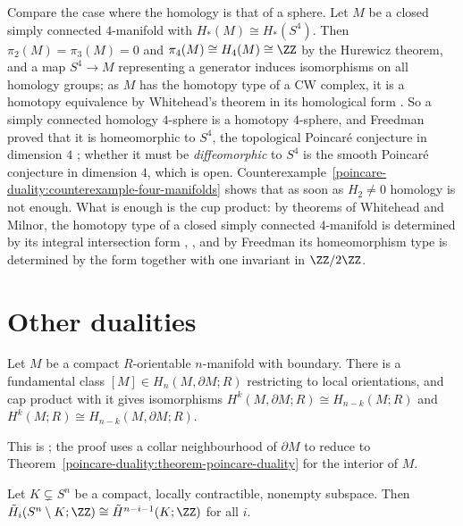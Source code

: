 \begin{remark}\label{poincare-duality:remark-poincare-conjecture}
Compare the case where the homology is that of a sphere. Let $M$ be a closed simply connected $4$-manifold with $H_*(M) \cong H_*(S^4)$. Then $\pi_2(M) = \pi_3(M) = 0$
and $\pi_4(M) \cong H_4(M) \cong \ZZ$ by the Hurewicz theorem, and a map $S^4 \to M$ representing a generator induces isomorphisms on all homology groups; as $M$ has the
homotopy type of a CW complex, it is a homotopy equivalence by Whitehead's theorem in its homological form \cite[Section 4.2 and Appendix]{hatcher-at}. So a
simply connected homology $4$-sphere is a homotopy $4$-sphere, and Freedman proved that it is homeomorphic to $S^4$, the topological Poincar\'e conjecture in
dimension $4$ \cite{freedman-1982}; whether it must be \emph{diffeomorphic} to $S^4$ is the smooth Poincar\'e conjecture in dimension $4$, which is open.
Counterexample~\ref{poincare-duality:counterexample-four-manifolds} shows that as soon as $H_2 \neq 0$ homology is not enough. What is enough is the cup product:
by theorems of Whitehead and Milnor, the homotopy type of a closed simply connected $4$-manifold is determined by its integral intersection form
\cite{whitehead-1949}, \cite{milnor-1958}, and by Freedman its homeomorphism type is determined by the form together with one invariant in $\ZZ/2\ZZ$.
\end{remark}

\section{Other dualities}\label{poincare-duality:section-other-dualities}

\begin{theorem}\label{poincare-duality:theorem-lefschetz-duality}
Let $M$ be a compact $R$-orientable $n$-manifold with boundary. There is a fundamental class $[M] \in H_n(M, \partial M; R)$ restricting to local orientations, and cap product with it
gives isomorphisms $H^k(M, \partial M; R) \cong H_{n-k}(M; R)$ and $H^k(M; R) \cong H_{n-k}(M, \partial M; R)$.
\end{theorem}

This is \cite[Theorem 3.43]{hatcher-at}; the proof uses a collar neighbourhood of $\partial M$ to reduce to Theorem~\ref{poincare-duality:theorem-poincare-duality} for the
interior of $M$.

\begin{theorem}\label{poincare-duality:theorem-alexander-duality}
Let $K \subsetneq S^n$ be a compact, locally contractible, nonempty subspace. Then $\tilde{H}_i(S^n \setminus K; \ZZ) \cong \tilde{H}^{n-i-1}(K; \ZZ)$ for all $i$.
\end{theorem}

